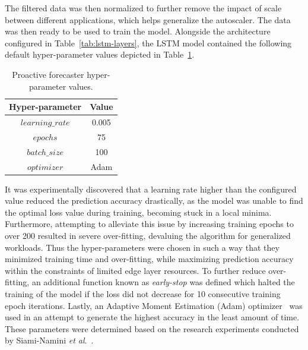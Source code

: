 The filtered data was then normalized to further remove the impact of scale between different applications, which helps generalize the autoscaler. The data was then ready to be used to train the model. Alongside the architecture configured in Table~\ref{tab:lstm-layers}, the LSTM model contained the following default hyper-parameter values depicted in Table~\ref{tab:lstm-params}.

\begin{table}
    \caption{Proactive forecaster hyper-parameter values.}\label{tab:lstm-params}
    \centering
    \begin{tabular}{cc}
        \toprule
        \textbf{Hyper-parameter} & \textbf{Value}\\
        \midrule
        $learning\_rate$ & 0.005\\
        $epochs$         & 75\\
        $batch\_size$    & 100\\
        $optimizer$      & Adam\\
        \toprule
    \end{tabular}
\end{table}

 It was experimentally discovered that a learning rate higher than the configured value reduced the prediction accuracy drastically, as the model was unable to find the optimal loss value during training, becoming stuck in a local minima. Furthermore, attempting to alleviate this issue by increasing training epochs to over 200 resulted in severe over-fitting, devaluing the algorithm for generalized workloads. Thus the hyper-parameters were chosen in such a way that they minimized training time and over-fitting, while maximizing prediction accuracy within the constraints of limited edge layer resources. To further reduce over-fitting, an additional function known as \textit{early-stop} was defined which halted the training of the model if the loss did not decrease for 10 consecutive training epoch iterations. Lastly, an Adaptive Moment Estimation (Adam) optimizer~\cite{diederik2014adam} was used in an attempt to generate the highest accuracy in the least amount of time. These parameters were determined based on the research experiments conducted by Siami-Namini \textit{et al}.~\cite{siami2018comparison}.\par

